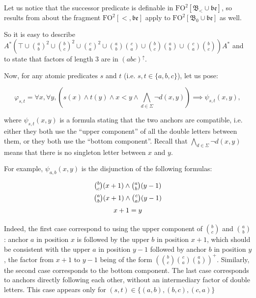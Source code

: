 \documentclass[a4paper,UKenglish,cleveref, autoref, thm-restate]{lipics-v2021}
\newcommand{\FO}{\mathrm{FO}}
\newcommand{\FOtw}{\FO^2}
\newcommand{\be}{\mathfrak{be}}
\newcommand{\bin}{\mathfrak{B}}
\begin{document}
Let us notice that the successor predicate is definable in $\FOtw[\bin_< \cup \be]$, so results from \cite{between} about the fragment $\FOtw[<,\be]$ apply to $\FOtw[\bin_0 \cup \be]$ as well.



So it is easy to describe $A^*(
        \top \cup
        \binom{a}{b}^2 \cup \binom{b}{c}^2 \cup \binom{c}{a}^2 \cup
        \binom{a}{b}\binom{c}{a} \cup
        \binom{b}{c}\binom{a}{b} \cup
        \binom{c}{a}\binom{b}{c}
    )A^*$
and to state that factors of length $3$ are in $(abc)^\uparrow$.

    
Now, for any atomic predicates $s$ and $t$ (i.e. $s,t\in\{a,b,c\}$), let us pose:

$$
\varphi_{s,t} = \forall x, \forall y,
\left(
    s(x) \land t(y) \land x<y \land \bigwedge_{d \in \Sigma} \neg d(x,y)
\right)
\implies
\psi_{s,t}(x,y),
$$


where $\psi_{s,t}(x,y)$ is a formula stating that the two anchors are compatible, i.e. either they both use the ``upper component'' of all the double letters between them, or they both use the ``bottom component''.
Recall that $\bigwedge_{d \in \Sigma}\neg d(x,y)$ means that there is no singleton letter between $x$ and $y$.

For example, $\psi_{a,b}(x,y)$ is the disjunction of the following formulas:
$$
\def\arraystretch{1.5}
    \begin{array}{c}
\binom{b}{c}(x+1)  \wedge \binom{a}{b}(y-1)\\
 \binom{a}{b}(x+1)  \wedge  \binom{c}{a}(y-1)\\
x+1=y
\end{array}
$$

Indeed, the first case correspond to using the upper component of $\binom{b}{c}$ and $\binom{a}{b}$: anchor $a$ in position $x$ is followed by the upper $b$ in position $x+1$, which should be consistent with the upper $a$ in position $y-1$ followed by anchor $b$ in position $y$, the factor from $x+1$ to $y-1$ being of the form $(\binom{b}{c}\binom{c}{a} \binom{a}{b})^+$. 
Similarly, the second case corresponds to the bottom component.
The last case corresponds to anchors directly following each other, without an intermediary factor of double letters. This case appears only for $(s,t)\in\{(a,b),(b,c),(c,a)\}$
\end{document}
